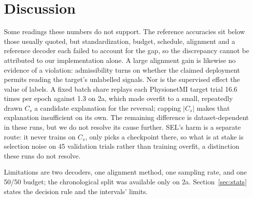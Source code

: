 \section{Discussion}

Some readings these numbers do not support. The reference accuracies sit below those usually quoted, but standardization, budget, schedule, alignment and a reference decoder each failed to account for the gap, so the discrepancy cannot be attributed to our implementation alone. A large alignment gain is likewise no evidence of a violation: admissibility turns on whether the claimed deployment permits reading the target's unlabelled signals. Nor is the supervised effect the value of labels. A fixed batch share replays each PhysionetMI target trial 16.6 times per epoch against 1.3 on 2a, which made overfit to a small, repeatedly drawn $C_s$ a candidate explanation for the reversal; capping $|C_s|$ makes that explanation insufficient on its own. The remaining difference is dataset-dependent in these runs, but we do not resolve its cause further. SEL's harm is a separate route: it never trains on $C_s$, only picks a checkpoint there, so what is at stake is selection noise on 45 validation trials rather than training overfit, a distinction these runs do not resolve.

Limitations are two decoders, one alignment method, one sampling rate, and one 50/50 budget; the chronological split was available only on 2a. Section~\ref{sec:stats} states the decision rule and the intervals' limits.
